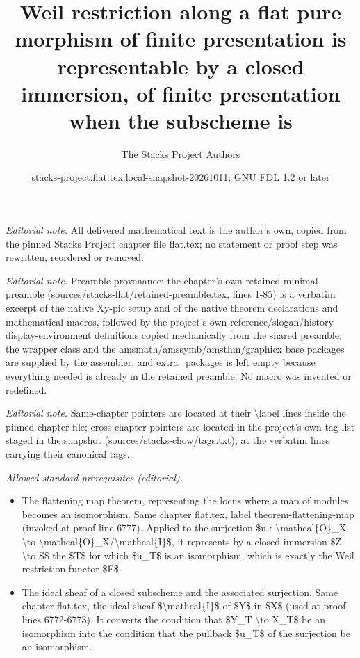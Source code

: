 \documentclass[10pt,a4paper]{amsart}
\title{Weil restriction along a flat pure morphism of finite presentation is representable by a closed immersion, of finite presentation when the subscheme is}
\author{The Stacks Project Authors}
\date{stacks-project:flat.tex:local-snapshot-20261011; GNU FDL 1.2 or later}
\theoremstyle{plain}
\theoremstyle{definition}
\theoremstyle{remark}
\numberwithin{equation}{subsection}
\begin{document}
\maketitle
\noindent\textit{Editorial note.} All delivered mathematical text is the author's own, copied from the pinned Stacks Project chapter file flat.tex; no statement or proof step was rewritten, reordered or removed.\par\medskip
\noindent\textit{Editorial note.} Preamble provenance: the chapter's own retained minimal preamble (sources/stacks-flat/retained-preamble.tex, lines 1-85) is a verbatim excerpt of the native Xy-pic setup and of the native theorem declarations and mathematical macros, followed by the project's own reference/slogan/history display-environment definitions copied mechanically from the shared preamble; the wrapper class and the amsmath/amssymb/amsthm/graphicx base packages are supplied by the assembler, and extra\_packages is left empty because everything needed is already in the retained preamble. No macro was invented or redefined.\par\medskip
\noindent\textit{Editorial note.} Same-chapter pointers are located at their \textbackslash{}label lines inside the pinned chapter file; cross-chapter pointers are located in the project's own tag list staged in the snapshot (sources/stacks-chow/tags.txt), at the verbatim lines carrying their canonical tags.\par\medskip
\noindent\textit{Allowed standard prerequisites (editorial).}\begin{itemize}
\item The flattening map theorem, representing the locus where a map of modules becomes an isomorphism. Same chapter flat.tex, label theorem-flattening-map (invoked at proof line 6777). Applied to the surjection \$u : \textbackslash{}mathcal\{O\}\_X \textbackslash{}to \textbackslash{}mathcal\{O\}\_X/\textbackslash{}mathcal\{I\}\$, it represents by a closed immersion \$Z \textbackslash{}to S\$ the \$T\$ for which \$u\_T\$ is an isomorphism, which is exactly the Weil restriction functor \$F\$.
\item The ideal sheaf of a closed subscheme and the associated surjection. Same chapter flat.tex, the ideal sheaf \$\textbackslash{}mathcal\{I\}\$ of \$Y\$ in \$X\$ (used at proof lines 6772-6773). It converts the condition that \$Y\_T \textbackslash{}to X\_T\$ be an isomorphism into the condition that the pullback \$u\_T\$ of the surjection be an isomorphism.
\end{itemize}\medskip
\end{document}
